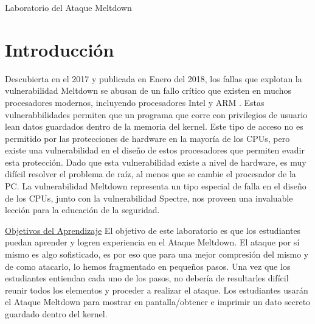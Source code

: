 
\newcommand{\commonfolder}{../../common-files}






\newcommand{\meltdownFigs}{./Figs}




\begin{center}
{\LARGE Laboratorio del Ataque Meltdown}
\end{center}



\section{Introducción}

Descubierta en el 2017 y publicada en Enero del 2018, los fallas que explotan la vulnerabilidad Meltdown se abusan de un fallo crítico que existen en muchos procesadores modernos, incluyendo procesadores Intel y ARM \cite{Lipp2018meltdown}. 
Estas vulnerabbilidades permiten que un programa que corre con privilegios de usuario lean datos guardados dentro de la memoria del kernel. Este tipo de acceso no es permitido por las protecciones de hardware en la mayoría de los CPUs, pero existe una vulnerabilidad en el diseño de estos procesadores que permiten evadir esta protección. Dado que esta vulnerabilidad existe a nivel de hardware, es muy difícil resolver el problema de raíz, al menos que se cambie el procesador de la PC. La vulnerabilidad Meltdown representa un tipo especial de falla en el diseño de los CPUs, junto con la vulnerabilidad Spectre, nos proveen una invaluable lección para la educación de la seguridad.

\underline{Objetivos del Aprendizaje} El objetivo de este laboratorio es que los estudiantes puedan aprender y logren experiencia en el Ataque Meltdown. El ataque por sí mismo es algo sofisticado, es por eso que para una mejor compresión del mismo y de como atacarlo, lo hemos fragmentado en pequeños pasos. Una vez que los estudiantes entiendan cada uno de los pasos, no debería de resultarles difícil reunir todos los elementos y proceder a realizar el ataque. Los estudiantes usarán el Ataque Meltdown para mostrar en pantalla/obtener e imprimir un dato secreto guardado dentro del kernel. 

